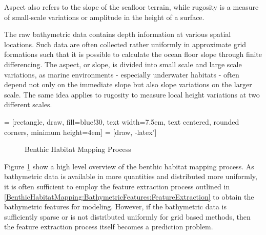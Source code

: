 		Aspect also refers to the slope of the seafloor terrain, while rugosity is a measure of small-scale variations or amplitude in the height of a surface.
		
		The raw bathymetric data contains depth information at various spatial locations. Such data are often collected rather uniformly in approximate grid formations such that it is possible to calculate the ocean floor slope through finite differencing. The aspect, or slope, is divided into small scale and large scale variations, as marine environments - especially underwater habitats - often depend not only on the immediate slope but also slope variations on the larger scale. The same idea applies to rugosity to measure local height variations at two different scales.
		
		 = [rectangle, draw, fill=blue!30,
		    text width=7.5em, text centered, rounded corners, minimum height=4em]
		 = [draw, -latex']
	
		\begin{figure}[!ht]
		\centering{}		
		\caption{Benthic Habitat Mapping Process}
		\label{Figure:BenthicHabitatMappingProcess}
		\end{figure}
		
		Figure \ref{Figure:BenthicHabitatMappingProcess} show a high level overview of the benthic habitat mapping process. As bathymetric data is available in more quantities and distributed more uniformly, it is often sufficient to employ the feature extraction process outlined in \cref{BenthicHabitatMapping:BathymetricFeatures:FeatureExtraction} to obtain the bathymetric features for modeling. However, if the bathymetric data is sufficiently sparse or is not distributed uniformly for grid based methods, then the feature extraction process itself becomes a prediction problem.

